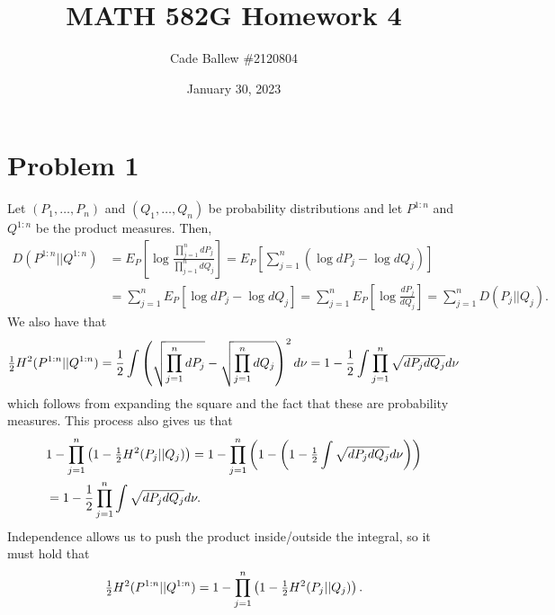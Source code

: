 \documentclass{article}
\title{MATH 582G Homework 4}
\author{Cade Ballew \#2120804}
\date{January 30, 2023}
\begin{document}
	
\maketitle
	
\section{Problem 1}
Let $(P_1,\ldots,P_n)$ and $(Q_1,\ldots,Q_n)$ be probability distributions and let $P^{1:n}$ and $Q^{1:n}$ be the product measures. Then,
\begin{align*}
D(P^{1:n}||Q^{1:n})&=E_P\left[\log\frac{\prod_{j=1}^ndP_j}{\prod_{j=1}^ndQ_j}\right]=E_P\left[\sum_{j=1}^{n}(\log dP_j-\log dQ_j)\right]\\&=
\sum_{j=1}^nE_P\left[\log dP_j-\log dQ_j\right]=\sum_{j=1}^nE_P\left[\log \frac{dP_j}{dQ_j}\right]=\sum_{j=1}^nD(P_j||Q_j).
\end{align*}
We also have that 
\begin{align*}
\mbox{$\frac{1}{2}$} H^2(P^{1:n}||Q^{1:n})=\frac{1}{2}\int\left(\sqrt{\prod_{j=1}^ndP_j}-\sqrt{\prod_{j=1}^ndQ_j}\right)^2d\nu=1-\frac{1}{2}\int\prod_{j=1}^n\sqrt{dP_jdQ_j}d\nu
\end{align*}
which follows from expanding the square and the fact that these are probability measures. This process also gives us that 
\begin{align*}
&1-\prod_{j=1}^n\left(1-\mbox{$\frac{1}{2}$} H^2(P_j||Q_j)\right)=1-\prod_{j=1}^n\left(1-\left(1-\mbox{$\frac{1}{2}$}\int\sqrt{dP_jdQ_j}d\nu\right)\right)\\&=
1-\frac{1}{2}\prod_{j=1}^n\int\sqrt{dP_jdQ_j}d\nu.
\end{align*}
Independence allows us to push the product inside/outside the integral, so it must hold that
\[
\mbox{$\frac{1}{2}$} H^2(P^{1:n}||Q^{1:n})=1-\prod_{j=1}^n\left(1-\mbox{$\frac{1}{2}$} H^2(P_j||Q_j)\right).
\]
\end{document}
